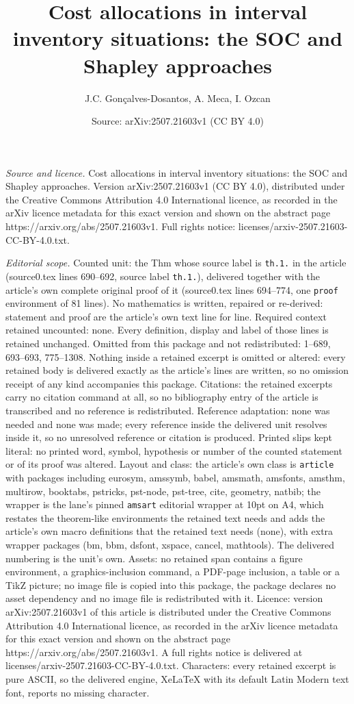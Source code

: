 \documentclass[10pt,a4paper]{amsart}
\title[Cost allocations in interval inventory situations: the SOC a]{Cost allocations in interval inventory situations: the SOC and Shapley approaches}
\author{J.C. Gon\c{c}alves-Dosantos, A. Meca, I. Ozcan}
\date{Source: arXiv:2507.21603v1 (CC BY 4.0)}
\begin{document}
\maketitle

\noindent\emph{Source and licence.} Cost allocations in interval inventory situations: the SOC and Shapley approaches. Version arXiv:2507.21603v1 (CC BY 4.0), distributed under the Creative Commons Attribution 4.0 International licence, as recorded in the arXiv licence metadata for this exact version and shown on the abstract page https://arxiv.org/abs/2507.21603v1. Full rights notice: licenses/arxiv-2507.21603-CC-BY-4.0.txt.\par\smallskip

\noindent\textit{Editorial scope.} Counted unit: the Thm whose source label is \texttt{th.1.} in the article (source0.tex lines 690--692, source label \texttt{th.1.}), delivered together with the article's own complete original proof of it (source0.tex lines 694--774, one \texttt{proof} environment of 81 lines). No mathematics is written, repaired or re-derived: statement and proof are the article's own text line for line. Required context retained uncounted: none. Every definition, display and label of those lines is retained unchanged. Omitted from this package and not redistributed: 1--689, 693--693, 775--1308. Nothing inside a retained excerpt is omitted or altered: every retained body is delivered exactly as the article's lines are written, so no omission receipt of any kind accompanies this package. Citations: the retained excerpts carry no citation command at all, so no bibliography entry of the article is transcribed and no reference is redistributed. Reference adaptation: none was needed and none was made; every reference inside the delivered unit resolves inside it, so no unresolved reference or citation is produced. Printed slips kept literal: no printed word, symbol, hypothesis or number of the counted statement or of its proof was altered. Layout and class: the article's own class is \texttt{article} with packages including eurosym, amssymb, babel, amsmath, amsfonts, amsthm, multirow, booktabs, pstricks, pst-node, pst-tree, cite, geometry, natbib; the wrapper is the lane's pinned \texttt{amsart} editorial wrapper at 10pt on A4, which restates the theorem-like environments the retained text needs and adds the article's own macro definitions that the retained text needs (none), with extra wrapper packages (bm, bbm, dsfont, xspace, cancel, mathtools). The delivered numbering is the unit's own. Assets: no retained span contains a figure environment, a graphics-inclusion command, a PDF-page inclusion, a table or a TikZ picture; no image file is copied into this package, the package declares no asset dependency and no image file is redistributed with it. Licence: version arXiv:2507.21603v1 of this article is distributed under the Creative Commons Attribution 4.0 International licence, as recorded in the arXiv licence metadata for this exact version and shown on the abstract page https://arxiv.org/abs/2507.21603v1. A full rights notice is delivered at licenses/arxiv-2507.21603-CC-BY-4.0.txt. Characters: every retained excerpt is pure ASCII, so the delivered engine, XeLaTeX with its default Latin Modern text font, reports no missing character.
\end{document}
